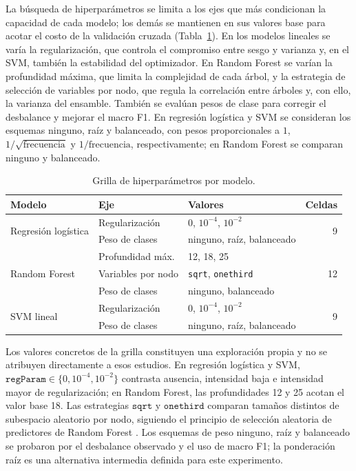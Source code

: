 \documentclass[conference]{IEEEtran}
\begin{document}
La búsqueda de hiperparámetros se limita a los ejes que más condicionan la capacidad de cada modelo; los demás se mantienen en sus valores base para acotar el costo de la validación cruzada (Tabla~\ref{tab:grilla_hiperparametros}). En los modelos lineales se varía la regularización, que controla el compromiso entre sesgo y varianza y, en el SVM, también la estabilidad del optimizador. En Random Forest se varían la profundidad máxima, que limita la complejidad de cada árbol, y la estrategia de selección de variables por nodo, que regula la correlación entre árboles y, con ello, la varianza del ensamble. También se evalúan pesos de clase para corregir el desbalance y mejorar el macro F1. En regresión logística y SVM se consideran los esquemas ninguno, raíz y balanceado, con pesos proporcionales a $1$, $1/\sqrt{\mathrm{frecuencia}}$ y $1/\mathrm{frecuencia}$, respectivamente; en Random Forest se comparan ninguno y balanceado.

\begin{table}[!b]
\centering
\caption{Grilla de hiperparámetros por modelo.}
\label{tab:grilla_hiperparametros}
\footnotesize
\setlength{\tabcolsep}{6pt}
\renewcommand{\arraystretch}{1.3}
\begin{tabular}{@{}p{1.4cm}p{2.2cm}p{2.6cm}r@{}}
\hline
\textbf{Modelo} & \textbf{Eje} & \textbf{Valores} & \textbf{Celdas} \\
\hline
\multirow{2}{=}{Regresión logística}
& Regularización & $0$, $10^{-4}$, $10^{-2}$ & \multirow{2}{*}{9} \\
& Peso de clases & ninguno, raíz, balanceado & \\
\hline
\multirow{3}{=}{Random Forest}
& Profundidad máx. & 12, 18, 25 & \multirow{3}{*}{12} \\
& Variables por nodo & \texttt{sqrt}, \texttt{onethird} & \\
& Peso de clases & ninguno, balanceado & \\
\hline
\multirow{2}{=}{SVM lineal}
& Regularización & $0$, $10^{-4}$, $10^{-2}$ & \multirow{2}{*}{9} \\
& Peso de clases & ninguno, raíz, balanceado & \\
\hline
\end{tabular}
\end{table}

Los valores concretos de la grilla constituyen una exploración propia y no se atribuyen directamente a esos estudios. En regresión logística y SVM, $\texttt{regParam}\in\{0,10^{-4},10^{-2}\}$ contrasta ausencia, intensidad baja e intensidad mayor de regularización; en Random Forest, las profundidades 12 y 25 acotan el valor base 18. Las estrategias $\texttt{sqrt}$ y $\texttt{onethird}$ comparan tamaños distintos de subespacio aleatorio por nodo, siguiendo el principio de selección aleatoria de predictores de Random Forest \cite{breiman2001}. Los esquemas de peso ninguno, raíz y balanceado se probaron por el desbalance observado y el uso de macro F1; la ponderación raíz es una alternativa intermedia definida para este experimento.
\end{document}
